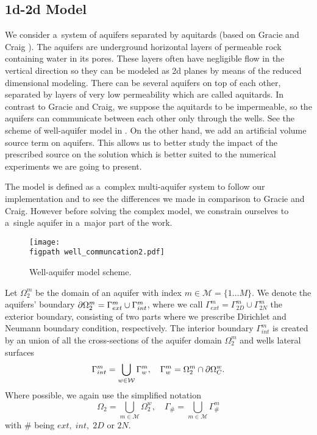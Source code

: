 \subsection{1d-2d Model}
We consider a~system of aquifers separated by aquitards
(based on Gracie and Craig \cite{gracie_modelling_2010,craig_using_2011}).
The aquifers are underground horizontal layers of permeable rock containing water in its pores.
These layers often have negligible flow in the vertical direction so they can be modeled
as 2d planes by means of the reduced dimensional modeling.
There can be several aquifers on top of each other, separated by layers of very low permeability
which are called aquitards.
In contrast to Gracie and Craig, we suppose the aquitards to be impermeable, 
so the aquifers can communicate between each other only through the wells.
See the scheme of well-aquifer model in .
On the other hand, we add an artificial volume source term on aquifers.
This allows us to better study the impact of the prescribed source on the solution
which is better suited to the numerical experiments we are going to present. 

The model is defined as a~complex multi-aquifer system to follow our implementation and to see the differences
we made in comparison to Gracie and Craig. However before solving the complex model,
we constrain ourselves to a~single aquifer in a~major part of the work.
%
\begin{figure}[!htb]
%     
  \begin{center}         
    \texttt{[image: \\figpath well\_communcation2.pdf]}
  \end{center}
  \caption{Well-aquifer model scheme.}
  \label{fig:well_flows}
\end{figure}

Let $\Omega^m_2$ be the domain of an aquifer with index $m\in\mathcal{M}=\{1\ldots M\}$.
We denote the aquifers' boundary $\partial\Omega^m_2 = \Gamma^m_{ext} \cup \Gamma^m_{int}$,
where we call $\Gamma^m_{ext} = \Gamma^m_{2D} \cup \Gamma^m_{2N}$ the exterior boundary, consisting of two parts where we prescribe
Dirichlet and Neumann boundary condition, respectively.
The interior boundary $\Gamma^m_{int}$ is created by an union of all the cross-sections of the aquifer domain $\Omega^m_2$
and wells lateral surfaces
\begin{equation}
    \Gamma^m_{int} = \bigcup_{\substack{w\in\mathcal{W}}} \Gamma^m_w, \quad \Gamma^m_w = \Omega^m_2 \cap \partial\Omega^w_C.
\end{equation}
Where possible, we again use the simplified notation
\begin{equation}
    \Omega_2 = \bigcup_{m\in\mathcal{M}} \Omega^w_2, \quad \Gamma_{\#} = \bigcup_{m\in\mathcal{M}} \Gamma^m_{\#}
\end{equation}
with $\#$ being $ext,\; int,\; 2D$ or $2N$.

